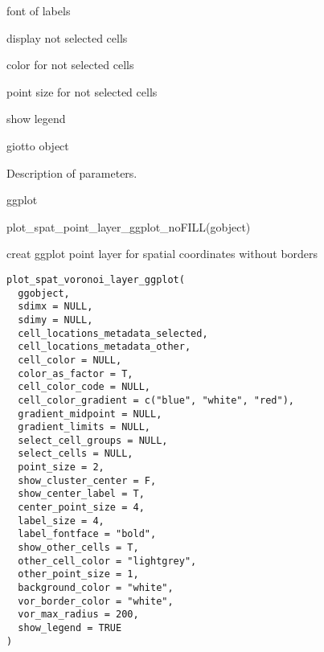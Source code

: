 \documentclass[a4paper]{book}
\begin{document}
\begin{Arguments}
\begin{ldescription}
\item[\code{label\_fontface}] font of labels

\item[\code{show\_other\_cells}] display not selected cells

\item[\code{other\_cell\_color}] color for not selected cells

\item[\code{other\_point\_size}] point size for not selected cells

\item[\code{show\_legend}] show legend

\item[\code{gobject}] giotto object
\end{ldescription}
\end{Arguments}
%
\begin{Details}\relax
Description of parameters.
\end{Details}
%
\begin{Value}
ggplot
\end{Value}
%
\begin{Examples}
\begin{ExampleCode}
    plot_spat_point_layer_ggplot_noFILL(gobject)
\end{ExampleCode}
\end{Examples}
%
\begin{Description}\relax
creat ggplot point layer for spatial coordinates without borders
\end{Description}
%
\begin{Usage}
\begin{verbatim}
plot_spat_voronoi_layer_ggplot(
  ggobject,
  sdimx = NULL,
  sdimy = NULL,
  cell_locations_metadata_selected,
  cell_locations_metadata_other,
  cell_color = NULL,
  color_as_factor = T,
  cell_color_code = NULL,
  cell_color_gradient = c("blue", "white", "red"),
  gradient_midpoint = NULL,
  gradient_limits = NULL,
  select_cell_groups = NULL,
  select_cells = NULL,
  point_size = 2,
  show_cluster_center = F,
  show_center_label = T,
  center_point_size = 4,
  label_size = 4,
  label_fontface = "bold",
  show_other_cells = T,
  other_cell_color = "lightgrey",
  other_point_size = 1,
  background_color = "white",
  vor_border_color = "white",
  vor_max_radius = 200,
  show_legend = TRUE
)
\end{verbatim}
\end{Usage}
\end{document}

